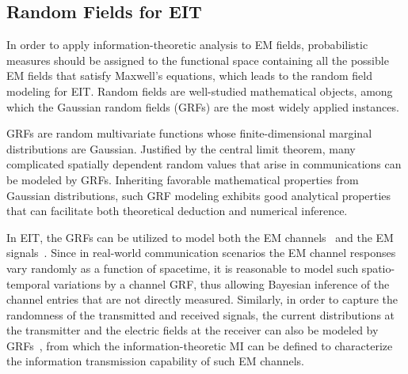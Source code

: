 \documentclass[journal,twocolumn]{IEEEtran}
\begin{document}
\subsection{Random Fields for EIT}
\label{Sec_2_Subsec_4}
In order to apply information-theoretic analysis to EM fields, probabilistic measures should be assigned to the functional space containing all the possible EM fields that satisfy Maxwell's equations, which leads to the random field modeling for EIT. 
Random fields are well-studied mathematical objects, among which the Gaussian random fields (GRFs) are the most widely applied instances. 

GRFs are random multivariate functions whose finite-dimensional marginal distributions are Gaussian. Justified by the central limit theorem, many complicated spatially dependent random values that arise in communications can be modeled by GRFs.  
Inheriting favorable mathematical properties from Gaussian distributions, such GRF modeling exhibits good analytical properties that can facilitate both theoretical deduction and numerical inference. 

In EIT, the GRFs can be utilized to model both the EM channels~\cite{marzetta2022fourier} and the EM signals~\cite{wan2022mutual}. Since in real-world communication scenarios the EM channel responses vary randomly as a function of spacetime, it is reasonable to model such spatio-temporal variations by a channel GRF, thus allowing Bayesian inference of the channel entries that are not directly measured. 
Similarly, in order to capture the randomness of the transmitted and received signals, the current distributions at the transmitter and the electric fields at the receiver can also be modeled by GRFs~\cite{wan2022mutual}, from which the information-theoretic MI can be defined to characterize the information transmission capability of such EM channels. 


\end{document}
